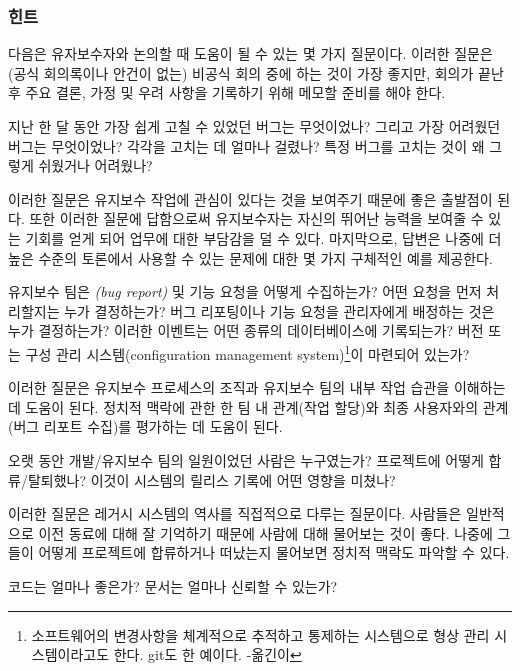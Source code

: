 \documentclass[a4paper,10pt,twoside]{book}
\begin{document}
\subsubsection*{힌트}

다음은 유자보수자와 논의할 때 도움이 될 수 있는 몇 가지 질문이다. 이러한 질문은 (공식 회의록이나 안건이 없는) 비공식 회의 중에 하는 것이 가장 좋지만, 회의가 끝난 후 주요 결론, 가정 및 우려 사항을 기록하기 위해 메모할 준비를 해야 한다.

\begin{bulletlist}
  \item 지난 한 달 동안 가장 쉽게 고칠 수 있었던 버그는 무엇이었나? 그리고 가장 어려웠던 버그는 무엇이었나? 각각을 고치는 데 얼마나 걸렸나? 특정 버그를 고치는 것이 왜 그렇게 쉬웠거나 어려웠나?

이러한 질문은 유지보수 작업에 관심이 있다는 것을 보여주기 때문에 좋은 출발점이 된다. 또한 이러한 질문에 답함으로써 유지보수자는 자신의 뛰어난 능력을 보여줄 수 있는 기회를 얻게 되어 업무에 대한 부담감을 덜 수 있다. 마지막으로, 답변은 나중에 더 높은 수준의 토론에서 사용할 수 있는  문제에 대한 몇 가지 구체적인 예를 제공한다.

  \item 유지보수 팀은 \emph{(bug report)} 및 기능 요청을 어떻게 수집하는가? 어떤 요청을 먼저 처리할지는 누가 결정하는가? 버그 리포팅이나 기능 요청을 관리자에게 배정하는 것은 누가 결정하는가? 이러한 이벤트는 어떤 종류의 데이터베이스에 기록되는가? 버전 또는 구성 관리 시스템(configuration management system)\footnote{소프트웨어의 변경사항을 체계적으로 추적하고 통제하는 시스템으로 형상 관리 시스템이라고도 한다. git도 한 예이다. -옮긴이}이 마련되어 있는가?

이러한 질문은 유지보수 프로세스의 조직과 유지보수 팀의 내부 작업 습관을 이해하는 데 도움이 된다. 정치적 맥락에 관한 한 팀 내 관계(작업 할당)와 최종 사용자와의 관계(버그 리포트 수집)를 평가하는 데 도움이 된다.

  \item 오랫 동안 개발/유지보수 팀의 일원이었던 사람은 누구였는가? 프로젝트에 어떻게 합류/탈퇴했나? 이것이 시스템의 릴리스 기록에 어떤 영향을 미쳤나?

이러한 질문은 레거시 시스템의 역사를 직접적으로 다루는 질문이다. 사람들은 일반적으로 이전 동료에 대해 잘 기억하기 때문에 사람에 대해 물어보는 것이 좋다. 나중에 그들이 어떻게 프로젝트에 합류하거나 떠났는지 물어보면 정치적 맥락도 파악할 수 있다.

  \item 코드는 얼마나 좋은가? 문서는 얼마나 신뢰할 수 있는가?


\end{bulletlist}
\end{document}
